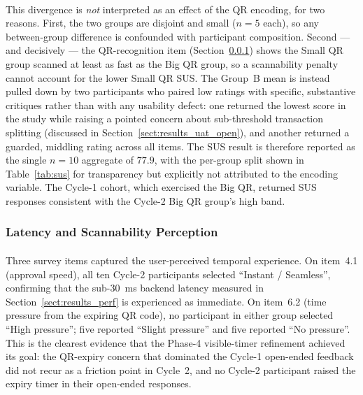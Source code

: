 \paragraph{}This divergence is \textit{not} interpreted as an effect of the QR encoding, for two reasons. First, the two groups are disjoint and small ($n = 5$ each), so any between-group difference is confounded with participant composition. Second --- and decisively --- the QR-recognition item (Section~\ref{sect:results_uat_qr}) shows the Small QR group scanned at least as fast as the Big QR group, so a scannability penalty cannot account for the lower Small QR SUS. The Group~B mean is instead pulled down by two participants who paired low ratings with specific, substantive critiques rather than with any usability defect: one returned the lowest score in the study while raising a pointed concern about sub-threshold transaction splitting (discussed in Section~\ref{sect:results_uat_open}), and another returned a guarded, middling rating across all items. The SUS result is therefore reported as the single $n = 10$ aggregate of $77.9$, with the per-group split shown in Table~\ref{tab:sus} for transparency but explicitly not attributed to the encoding variable. The Cycle-1 cohort, which exercised the Big QR, returned SUS responses consistent with the Cycle-2 Big QR group's high band.

\subsubsection{Latency and Scannability Perception}
\label{sect:results_uat_qr}

\paragraph{}Three survey items captured the user-perceived temporal experience. On item~4.1 (approval speed), all ten Cycle-2 participants selected ``Instant / Seamless'', confirming that the sub-$30$~ms backend latency measured in Section~\ref{sect:results_perf} is experienced as immediate. On item~6.2 (time pressure from the expiring QR code), no participant in either group selected ``High pressure''; five reported ``Slight pressure'' and five reported ``No pressure''. This is the clearest evidence that the Phase-4 visible-timer refinement achieved its goal: the QR-expiry concern that dominated the Cycle-1 open-ended feedback did not recur as a friction point in Cycle~2, and no Cycle-2 participant raised the expiry timer in their open-ended responses.

